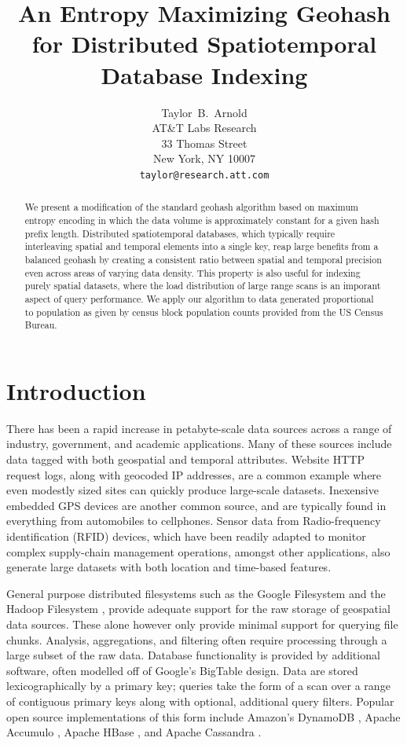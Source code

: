 \documentclass[nips13submit_09,times,art10]{article} %
\title{An Entropy Maximizing Geohash for Distributed Spatiotemporal Database Indexing}
\author{
Taylor~B.~Arnold \\
AT\&T Labs Research\\
33 Thomas Street\\
New York, NY 10007 \\
\texttt{taylor@research.att.com}
}
\begin{document}
\maketitle

\begin{abstract}
We present a modification of the standard geohash algorithm
based on maximum entropy encoding in which the data volume
is approximately constant for a given hash prefix length.
Distributed spatiotemporal databases, which typically require interleaving
spatial and temporal elements into a single key, reap large benefits
from a balanced geohash by creating a consistent ratio between spatial
and temporal precision even across areas of varying data density.
This property is also useful for indexing purely spatial datasets,
where the load distribution of large range scans is an imporant aspect
of query performance.  We apply our algorithm to data generated
proportional to population as given by census block population
counts provided from the US Census Bureau.
\end{abstract}

\section{Introduction}  \label{sec:intro}

There has been a rapid increase in petabyte-scale data sources across
a range of industry, government, and academic applications. Many of
these sources include data tagged with both geospatial and temporal
attributes. Website HTTP request logs, along with geocoded IP addresses,
are a common example where even modestly sized sites can quickly produce
large-scale datasets. Inexensive embedded GPS devices are another common
source, and are typically found in everything from automobiles to cellphones.
Sensor data from Radio-frequency identification (RFID) devices, which have
been readily adapted to monitor complex supply-chain management operations,
amongst other applications, also generate large datasets with both location
and time-based features.

General purpose distributed filesystems such as the Google Filesystem \cite{ghemawat2003google}
and the Hadoop Filesystem \cite{shvachko2010hadoop}, provide adequate
support for the raw storage of geospatial data sources. These alone however only
provide minimal support for querying file chunks. Analysis, aggregations, and filtering
often require processing through a large subset of the raw data. Database functionality
is provided by additional software, often modelled off of Google's
BigTable \cite{chang2008bigtable} design. Data are stored lexicographically
by a primary key; queries take the form of a scan over a range of contiguous
primary keys along with optional, additional query filters.
Popular open source implementations of this form include Amazon's DynamoDB \cite{decandia2007dynamo},
Apache Accumulo \cite{fuchs2012accumulo}, Apache HBase \cite{taylor2010overview},
and Apache Cassandra \cite{lakshman2010cassandra}.
\end{document}
